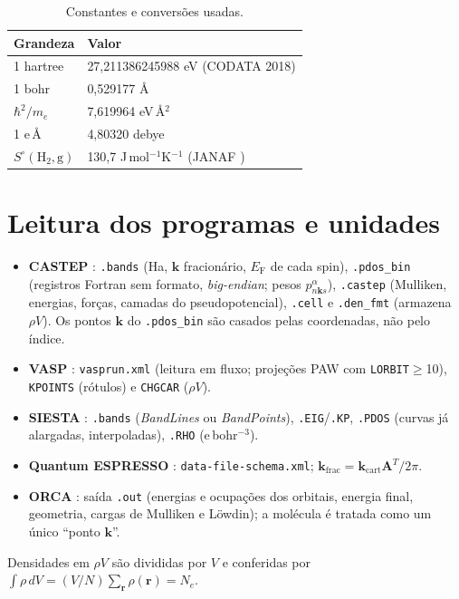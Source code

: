 \documentclass[11pt,a4paper]{article}
\newcommand{\kv}{\mathbf k}\newcommand{\eF}{E_\mathrm{F}}\newcommand{\code}[1]{\texttt{#1}}
\begin{document}
\begin{table}[h]\centering\small
\caption{Constantes e conversões usadas.}
\begin{tabular}{@{}ll@{}}\toprule
Grandeza & Valor \\\midrule
1 hartree & 27,211386245988 eV (CODATA 2018) \\
1 bohr & 0,529177 Å \\
$\hbar^2/m_e$ & 7,619964 eV\,Å$^2$ \\
1 e\,Å & 4,80320 debye \\
$S^\circ(\mathrm{H_2},\mathrm{g})$ & 130,7 J\,mol$^{-1}$K$^{-1}$ (JANAF \cite{chase1998janaf}) \\\bottomrule
\end{tabular}\end{table}

\section{Leitura dos programas e unidades}
\begin{itemize}
\item \textbf{CASTEP} \cite{clark2005castep}: \code{.bands} (Ha, $\kv$ fracionário, $\eF$ de cada spin), \code{.pdos\_bin} (registros Fortran sem formato, \emph{big-endian}; pesos $p^\alpha_{n\kv s}$), \code{.castep} (Mulliken, energias, forças, camadas do pseudopotencial), \code{.cell} e \code{.den\_fmt} (armazena $\rho V$). Os pontos $\kv$ do \code{.pdos\_bin} são casados pelas coordenadas, não pelo índice.
\item \textbf{VASP} \cite{kresse1996vasp}: \code{vasprun.xml} (leitura em fluxo; projeções PAW com \code{LORBIT}$\ge$10), \code{KPOINTS} (rótulos) e \code{CHGCAR} ($\rho V$).
\item \textbf{SIESTA} \cite{soler2002siesta}: \code{.bands} (\emph{BandLines} ou \emph{BandPoints}), \code{.EIG}/\code{.KP}, \code{.PDOS} (curvas já alargadas, interpoladas), \code{.RHO} (e\,bohr$^{-3}$).
\item \textbf{Quantum ESPRESSO} \cite{giannozzi2009,giannozzi2017}: \code{data-file-schema.xml}; $\kv_\mathrm{frac}=\kv_\mathrm{cart}\mathbf A^{T}/2\pi$.
\item \textbf{ORCA} \cite{neese2020}: saída \code{.out} (energias e ocupações dos orbitais, energia final, geometria, cargas de Mulliken e Löwdin); a molécula é tratada como um único ``ponto $\kv$''.
\end{itemize}
Densidades em $\rho V$ são divididas por $V$ e conferidas por $\int\rho\,dV=(V/N)\sum_{\mathbf r}\rho(\mathbf r)=N_e$.
\end{document}
